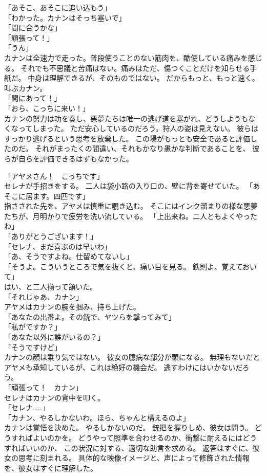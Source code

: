 \documentclass[../IHMain]{subfiles}
\begin{document}
「あそこ、あそこに追い込もう」\\
「わかった。カナンはそっち塞いで」\\
「間に合うかな」\\
「頑張って！」\\
「うん」\\
カナンは全速力で走った。普段使うことのない筋肉を、酷使している痛みを感じる。
それでも不思議と苦痛はない。痛みはただ、傷つくことだけを知らせる手紙だ。
中身は理解できるが、そのものではない。
だからもっと、もっと速く。
叫ぶカナン。\\
「間にあって！」\\
「おら、こっちに来い！」\\
カナンの努力は功を奏し、悪夢たちは唯一の逃げ道を塞がれ、どうしようもなくなってしまった。
ただ安心しているのだろう。狩人の姿は見えない。
彼らはすっかり逃げるという思考を放棄した。
この場がもっとも安全であると評価したのだ。
それがまったくの間違い、それもかなり愚かな判断であることを、
彼らが自らを評価できるはずもなかった。

「アヤメさん！　こっちです」\\
セレナが手招きをする。
二人は袋小路の入り口の、壁に背を寄せていた。
「あそこに居ます。四匹です」\\
指さされた先を、アヤメは慎重に覗き込む。
そこにはインク溜まりの様な悪夢たちが、月明かりで疲労を洗い流している。
「上出来ね。二人ともよくやったわ」\\
「ありがとうございます！」\\
「セレナ、まだ喜ぶのは早いわ」\\
「あ、そうですよね。仕留めてないし」\\
「そうよ。こういうところで気を抜くと、痛い目を見る。
鉄則よ、覚えておいて」\\
はい、と二人揃って頷いた。\\
「それじゃあ、カナン」\\
アヤメはカナンの腕を掴み、持ち上げた。\\
「あなたの出番よ。その銃で、ヤツらを撃ってみて」\\
「私がですか？」\\
「あなた以外に誰がいるの？」\\
「そうですけど」\\
カナンの顔は乗り気ではない。
彼女の臆病な部分が顕になる。
無理もないだとアヤメも承知しているが、これは絶好の機会だ。
逃すわけにはいかないだろう。\\
「頑張って！　カナン」\\
セレナはカナンの背中を叩く。\\
「セレナ……」\\
「カナン、やるしかないわ。ほら、ちゃんと構えるのよ」\\
カナンは覚悟を決めた。
やるしかないのだ。
銃把を握りしめ、彼女は問う。
どうすればよいのかを。
どうやって照準を合わせるのか、衝撃に耐えるにはどうすればいいのか、
この状況に対する、適切な助言を求める。
返答はすぐに、彼女の思考に刻まれる。
具体的な映像イメージと、声によって修飾された情報を、彼女はすぐに理解した。
\end{document}

